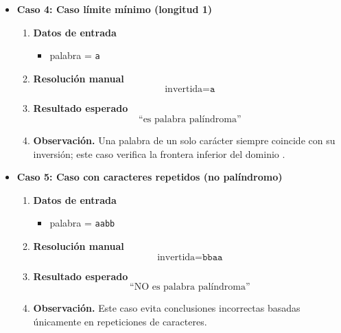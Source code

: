 \documentclass[12pt,twoside]{book}
\begin{document}
\begin{itemize}
							\begin{enumerate}
								\item \textbf{Datos de entrada}
								\begin{itemize}
									\item palabra = \texttt{anna}
								\end{itemize}
								\item \textbf{Resolución manual}
								\[
								\text{invertida} = \texttt{anna}
								\]
								\item \textbf{Resultado esperado}
								\[
								\text{``es palabra palíndroma''}
								\]
								\item \textbf{Observación.} Este caso confirma que la solución no depende de que la longitud sea impar; depende de la igualdad palabra--inversión.
							\end{enumerate}
							
							\item \textbf{Caso 4: Caso límite mínimo (longitud 1)}
							
							\begin{enumerate}
								\item \textbf{Datos de entrada}
								\begin{itemize}
									\item palabra = \texttt{a}
								\end{itemize}
								\item \textbf{Resolución manual}
								\[
								\text{invertida} = \texttt{a}
								\]
								\item \textbf{Resultado esperado}
								\[
								\text{``es palabra palíndroma''}
								\]
								\item \textbf{Observación.} Una palabra de un solo carácter siempre coincide con su inversión; este caso verifica la frontera inferior del dominio \cite{Gaddis2022Starting}.
							\end{enumerate}
							
							\item \textbf{Caso 5: Caso con caracteres repetidos (no palíndromo)}
							\begin{enumerate}
								\item \textbf{Datos de entrada}
								\begin{itemize}
									\item palabra = \texttt{aabb}
								\end{itemize}
								\item \textbf{Resolución manual}
								\[
								\text{invertida} = \texttt{bbaa}
								\]
								\item \textbf{Resultado esperado}
								\[
								\text{``NO es palabra palíndroma''}
								\]
								\item \textbf{Observación.} Este caso evita conclusiones incorrectas basadas únicamente en repeticiones de caracteres.
							\end{enumerate}
						\end{itemize}
						
\end{document}
